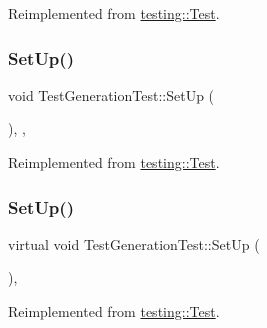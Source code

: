 Reimplemented from \mbox{\hyperlink{classtesting_1_1_test_a190315150c303ddf801313fd1a777733}{testing\+::\+Test}}.

\mbox{\label{class_test_generation_test_a06cbce86435733a568824f9641ea57c2}} 
\subsubsection{\texorpdfstring{SetUp()}{SetUp()}\hspace{0.1cm}{\footnotesize\ttfamily [2/3]}}
{\footnotesize\ttfamily void Test\+Generation\+Test\+::\+Set\+Up (\begin{DoxyParamCaption}{ }\end{DoxyParamCaption})\hspace{0.3cm}{\ttfamily [inline]}, {\ttfamily [override]}, {\ttfamily [virtual]}}



Reimplemented from \mbox{\hyperlink{classtesting_1_1_test_a190315150c303ddf801313fd1a777733}{testing\+::\+Test}}.

\mbox{\label{class_test_generation_test_a9705d633439b360b338503599a360ea8}} 
\subsubsection{\texorpdfstring{SetUp()}{SetUp()}\hspace{0.1cm}{\footnotesize\ttfamily [3/3]}}
{\footnotesize\ttfamily virtual void Test\+Generation\+Test\+::\+Set\+Up (\begin{DoxyParamCaption}{ }\end{DoxyParamCaption})\hspace{0.3cm}{\ttfamily [inline]}, {\ttfamily [virtual]}}



Reimplemented from \mbox{\hyperlink{classtesting_1_1_test_a190315150c303ddf801313fd1a777733}{testing\+::\+Test}}.

\mbox{\label{class_test_generation_test_a3e1681e93e14b17fe923e763d88940cb}} 
